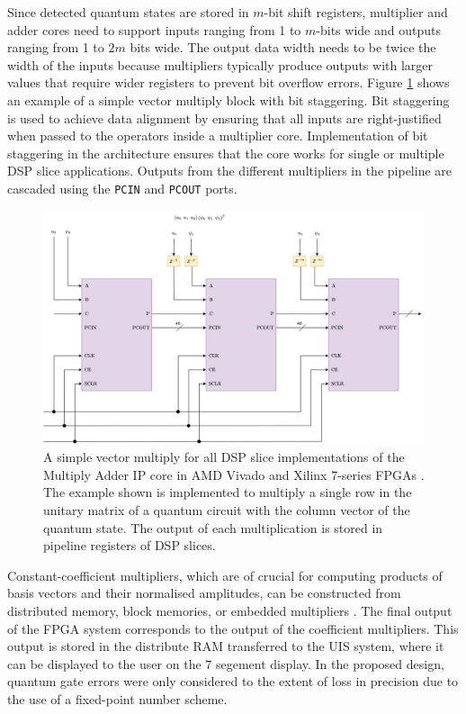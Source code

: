 Since detected quantum states are stored in $m$-bit shift registers, multiplier and adder cores need to support inputs ranging from 1 to $m$-bits wide and outputs ranging from 1 to $2m$ bits wide. The output data width needs to be twice the width of the inputs because multipliers typically produce outputs with larger values that require wider registers to prevent bit overflow errors. Figure \ref{fig:xilinx-vector-multiply} shows an example of a simple vector multiply block with bit staggering. Bit staggering is used to achieve data alignment by ensuring that all inputs are right-justified when passed to the operators inside a multiplier core. Implementation of bit staggering in the architecture ensures that the core works for single or multiple DSP slice applications. Outputs from the different multipliers in the pipeline are cascaded using the \texttt{PCIN} and \texttt{PCOUT} ports.
\begin{figure}[!ht]
	\centering
	\includegraphics[width=\linewidth]{body/ch4/figs/xilinx-vector-multiply}
	\caption[Simple Vector Multiply Block using the LogiCORE IP Multiply Adder.]{A simple vector multiply for all DSP slice implementations of the Multiply Adder IP core in AMD Vivado and Xilinx 7-series FPGAs \cite{xilinx2015multiplier}. The example shown is implemented to multiply a single row in the unitary matrix of a quantum circuit with the column vector of the quantum state. The output of each multiplication is stored in pipeline registers of DSP slices.}
	\label{fig:xilinx-vector-multiply}
\end{figure}

Constant-coefficient multipliers, which are of crucial for computing products of basis vectors and their normalised amplitudes, can be constructed from distributed memory, block memories, or embedded multipliers \cite{xilinx2015multiplier}. The final output of the FPGA system corresponds to the output of the coefficient multipliers. This output is stored in the distribute RAM transferred to the UIS system, where it can be displayed to the user on the 7 segement display. In the proposed design, quantum gate errors were only considered to the extent of loss in precision due to the use of a fixed-point number scheme.  

